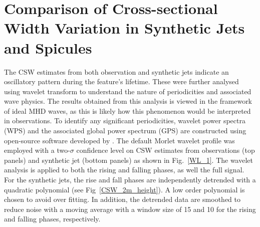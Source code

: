 \section{Comparison of Cross-sectional Width Variation in Synthetic Jets and Spicules}
\label{sec:CSW_comp}
The CSW estimates from both observation and synthetic jets indicate an oscillatory pattern during the feature’s lifetime. These were further analysed using wavelet transform to understand the nature of periodicities and associated wave physics. The results obtained from this analysis is viewed in the framework of ideal MHD waves, as this is likely how this phenomenon would be interpreted in observations. To identify any significant periodicities, wavelet power spectra (WPS) and the associated global power spectrum (GPS) are constructed using open-source software developed by \cite{Torrence1998}. The default Morlet wavelet profile was employed with a two-$\sigma$ confidence level on CSW estimates from observations (top panels) and synthetic jet (bottom panels) as shown in Fig.~\ref{WL_1}. The wavelet analysis is applied to both the rising and falling phases, as well the full signal. For the synthetic jets, the rise and fall phases are independently detrended with a quadratic polynomial (see Fig~\ref{CSW_2m_height}). A low order polynomial is chosen to avoid over fitting. In addition, the detrended data are smoothed to reduce noise with a moving average with a window size of 15 and 10 for the rising and falling phases, respectively. \np
%
